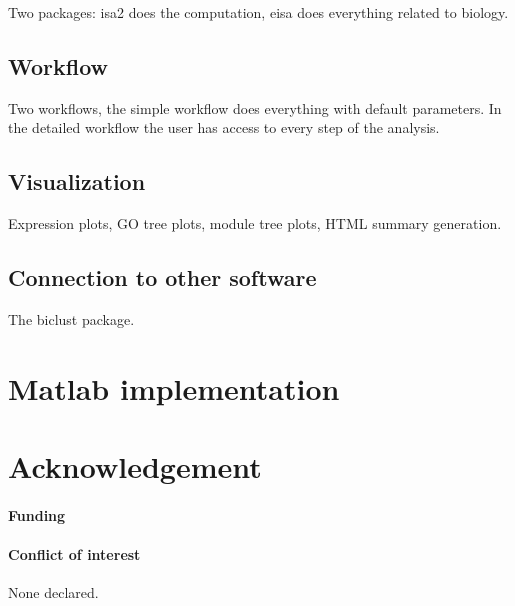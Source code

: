 \documentclass{bioinfo}
\begin{document}
Two packages: isa2 does the computation, eisa does everything related
to biology.

\subsection{Workflow}

Two workflows, the simple workflow does everything with default
parameters. In the detailed workflow the user has access to every step
of the analysis.

\subsection{Visualization}

Expression plots, GO tree plots, module tree plots, HTML summary
generation.

\subsection{Connection to other software}

The biclust package.

\section{Matlab implementation}

\section*{Acknowledgement}

\paragraph{Funding\textcolon} 

\paragraph{Conflict of interest\textcolon} None declared.



\nocite{*}
\end{document}
